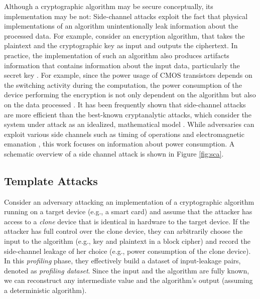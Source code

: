 Although a cryptographic algorithm may be secure conceptually, its implementation may be not: Side-channel attacks exploit the fact that physical implementations of an algorithm unintentionally leak information about the processed data. For example, consider an encryption algorithm, that takes the plaintext and the cryptographic key as input and outputs the ciphertext. In practice, the implementation of such an algorithm also produces artifacts information that contains information about the input data, particularly the secret key \cite{scas}. For example, since the power usage of CMOS transistors depends on the switching activity during the computation, the power consumption of the device performing the encryption is not only dependent on the algorithm but also on the data processed \cite{intro_sca}. It has been frequently shown that side-channel attacks are more efficient than the best-known cryptanalytic attacks, which consider the system under attack as an idealized, mathematical model \cite{intro_sca}.
While adversaries can exploit various side channels such as timing of operations \cite{timing_kocher} and electromagnetic emanation \cite{em_gandolfi}, this work focuses on information about power consumption. A schematic overview of a side channel attack is shown in Figure \ref{fig:sca}.


\subsection{Template Attacks}
\label{sec:ta}
Consider an adversary attacking an implementation of a cryptographic algorithm running on a target device (e.g., a smart card) and assume that the attacker has access to a \textit{clone} device that is identical in hardware to the target device. If the attacker has full control over the clone device, they can arbitrarily choose the input to the algorithm (e.g., key and plaintext in a block cipher) and record the side-channel leakage of her choice (e.g., power consumption of the clone device). In this \textit{profiling} phase, they effectively build a dataset of input-leakage pairs, denoted as \textit{profiling dataset}. Since the input and the algorithm are fully known, we can reconstruct any intermediate value and the algorithm's output (assuming a deterministic algorithm).

